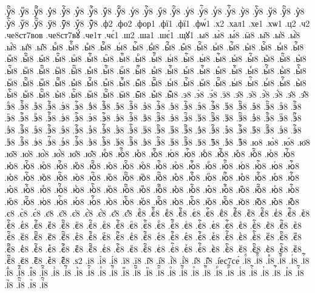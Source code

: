 {.уⷻ҇8
.уⷼ8
.уⷼ҇8
.уⷽ8
.уⷽ҇8
.уⷾ8
.уⷾ҇8
.уⷿ8
.уⷿ҇8
.уꙴ8
.уꙴ҇8
.уꙵ8
.уꙵ҇8
.уꙶ8
.уꙶ҇8
.уꙷ8
.уꙷ҇8
.уꙸ8
.уꙸ҇8
.уꙹ8
.уꙹ҇8
.уꙺ8
.уꙺ҇8
.уꙻ8
.уꙻ҇8
.у꙼8
.у꙼҇8
.у꙽8
.у꙽҇8
.ф2
.фо2
.фор1
.фї1
.фї1
.фѡ́1
.х2
.хал1
.хе1
.хѡ1
.ц2
.ч2
.че8ст7вов
.че8ст7вꙋ́
.че1т
.чє́1
.ш2
.ша1
.шє́1
.щꙋ1
.ы8
.ы̀8
.ы́8
.ӹ8
.ы̑8
.ы҆8
.ы҆̀8
.ы҆́8
.ы҆̈8
.ы҆̑8
.ыⷠ8
.ыⷠ҇8
.ыⷡ8
.ыⷡ҇8
.ыⷢ8
.ыⷢ҇8
.ыⷣ8
.ыⷣ҇8
.ыⷤ8
.ыⷤ҇8
.ыⷥ8
.ыⷥ҇8
.ыⷦ8
.ыⷦ҇8
.ыⷧ8
.ыⷧ҇8
.ыⷨ8
.ыⷨ҇8
.ыⷩ8
.ыⷩ҇8
.ыⷪ8
.ыⷪ҇8
.ыⷫ8
.ыⷫ҇8
.ыⷬ8
.ыⷬ҇8
.ыⷭ8
.ыⷭ҇8
.ыⷮ8
.ыⷮ҇8
.ыⷯ8
.ыⷯ҇8
.ыⷰ8
.ыⷰ҇8
.ыⷱ8
.ыⷱ҇8
.ыⷲ8
.ыⷲ҇8
.ыⷳ8
.ыⷳ҇8
.ыⷴ8
.ыⷴ҇8
.ыⷵ8
.ыⷵ҇8
.ыⷶ8
.ыⷶ҇8
.ыⷷ8
.ыⷷ҇8
.ыⷸ8
.ыⷸ҇8
.ыⷹ8
.ыⷹ҇8
.ыⷺ8
.ыⷺ҇8
.ыⷻ8
.ыⷻ҇8
.ыⷼ8
.ыⷼ҇8
.ыⷽ8
.ыⷽ҇8
.ыⷾ8
.ыⷾ҇8
.ыⷿ8
.ыⷿ҇8
.ыꙴ8
.ыꙴ҇8
.ыꙵ8
.ыꙵ҇8
.ыꙶ8
.ыꙶ҇8
.ыꙷ8
.ыꙷ҇8
.ыꙸ8
.ыꙸ҇8
.ыꙹ8
.ыꙹ҇8
.ыꙺ8
.ыꙺ҇8
.ыꙻ8
.ыꙻ҇8
.ы꙼8
.ы꙼҇8
.ы꙽8
.ы꙽҇8
.э8
.э̀8
.э́8
.ӭ8
.э̑8
.э҆8
.э҆̀8
.э҆́8
.э҆̈8
.э҆̑8
.эⷠ8
.эⷠ҇8
.эⷡ8
.эⷡ҇8
.эⷢ8
.эⷢ҇8
.эⷣ8
.эⷣ҇8
.эⷤ8
.эⷤ҇8
.эⷥ8
.эⷥ҇8
.эⷦ8
.эⷦ҇8
.эⷧ8
.эⷧ҇8
.эⷨ8
.эⷨ҇8
.эⷩ8
.эⷩ҇8
.эⷪ8
.эⷪ҇8
.эⷫ8
.эⷫ҇8
.эⷬ8
.эⷬ҇8
.эⷭ8
.эⷭ҇8
.эⷮ8
.эⷮ҇8
.эⷯ8
.эⷯ҇8
.эⷰ8
.эⷰ҇8
.эⷱ8
.эⷱ҇8
.эⷲ8
.эⷲ҇8
.эⷳ8
.эⷳ҇8
.эⷴ8
.эⷴ҇8
.эⷵ8
.эⷵ҇8
.эⷶ8
.эⷶ҇8
.эⷷ8
.эⷷ҇8
.эⷸ8
.эⷸ҇8
.эⷹ8
.эⷹ҇8
.эⷺ8
.эⷺ҇8
.эⷻ8
.эⷻ҇8
.эⷼ8
.эⷼ҇8
.эⷽ8
.эⷽ҇8
.эⷾ8
.эⷾ҇8
.эⷿ8
.эⷿ҇8
.эꙴ8
.эꙴ҇8
.эꙵ8
.эꙵ҇8
.эꙶ8
.эꙶ҇8
.эꙷ8
.эꙷ҇8
.эꙸ8
.эꙸ҇8
.эꙹ8
.эꙹ҇8
.эꙺ8
.эꙺ҇8
.эꙻ8
.эꙻ҇8
.э꙼8
.э꙼҇8
.э꙽8
.э꙽҇8
.ю8
.ю̀8
.ю́8
.ю̈8
.ю̑8
.ю҆8
.ю҆̀8
.ю҆́8
.ю҆̈8
.ю҆̑8
.юⷠ8
.юⷠ҇8
.юⷡ8
.юⷡ҇8
.юⷢ8
.юⷢ҇8
.юⷣ8
.юⷣ҇8
.юⷤ8
.юⷤ҇8
.юⷥ8
.юⷥ҇8
.юⷦ8
.юⷦ҇8
.юⷧ8
.юⷧ҇8
.юⷨ8
.юⷨ҇8
.юⷩ8
.юⷩ҇8
.юⷪ8
.юⷪ҇8
.юⷫ8
.юⷫ҇8
.юⷬ8
.юⷬ҇8
.юⷭ8
.юⷭ҇8
.юⷮ8
.юⷮ҇8
.юⷯ8
.юⷯ҇8
.юⷰ8
.юⷰ҇8
.юⷱ8
.юⷱ҇8
.юⷲ8
.юⷲ҇8
.юⷳ8
.юⷳ҇8
.юⷴ8
.юⷴ҇8
.юⷵ8
.юⷵ҇8
.юⷶ8
.юⷶ҇8
.юⷷ8
.юⷷ҇8
.юⷸ8
.юⷸ҇8
.юⷹ8
.юⷹ҇8
.юⷺ8
.юⷺ҇8
.юⷻ8
.юⷻ҇8
.юⷼ8
.юⷼ҇8
.юⷽ8
.юⷽ҇8
.юⷾ8
.юⷾ҇8
.юⷿ8
.юⷿ҇8
.юꙴ8
.юꙴ҇8
.юꙵ8
.юꙵ҇8
.юꙶ8
.юꙶ҇8
.юꙷ8
.юꙷ҇8
.юꙸ8
.юꙸ҇8
.юꙹ8
.юꙹ҇8
.юꙺ8
.юꙺ҇8
.юꙻ8
.юꙻ҇8
.ю꙼8
.ю꙼҇8
.ю꙽8
.ю꙽҇8
.є8
.є̀8
.є́8
.є̈8
.є̑8
.є҆8
.є҆̀8
.є҆́8
.є҆̈8
.є҆̑8
.єⷠ8
.єⷠ҇8
.єⷡ8
.єⷡ҇8
.єⷢ8
.єⷢ҇8
.єⷣ8
.єⷣ҇8
.єⷤ8
.єⷤ҇8
.єⷥ8
.єⷥ҇8
.єⷦ8
.єⷦ҇8
.єⷧ8
.єⷧ҇8
.єⷨ8
.єⷨ҇8
.єⷩ8
.єⷩ҇8
.єⷪ8
.єⷪ҇8
.єⷫ8
.єⷫ҇8
.єⷬ8
.єⷬ҇8
.єⷭ8
.єⷭ҇8
.єⷮ8
.єⷮ҇8
.єⷯ8
.єⷯ҇8
.єⷰ8
.єⷰ҇8
.єⷱ8
.єⷱ҇8
.єⷲ8
.єⷲ҇8
.єⷳ8
.єⷳ҇8
.єⷴ8
.єⷴ҇8
.єⷵ8
.єⷵ҇8
.єⷶ8
.єⷶ҇8
.єⷷ8
.єⷷ҇8
.єⷸ8
.єⷸ҇8
.єⷹ8
.єⷹ҇8
.єⷺ8
.єⷺ҇8
.єⷻ8
.єⷻ҇8
.єⷼ8
.єⷼ҇8
.єⷽ8
.єⷽ҇8
.єⷾ8
.єⷾ҇8
.єⷿ8
.єⷿ҇8
.єꙴ8
.єꙴ҇8
.єꙵ8
.єꙵ҇8
.єꙶ8
.єꙶ҇8
.єꙷ8
.єꙷ҇8
.єꙸ8
.єꙸ҇8
.єꙹ8
.єꙹ҇8
.єꙺ8
.єꙺ҇8
.єꙻ8
.єꙻ҇8
.є꙼8
.є꙼҇8
.є꙽8
.є꙽҇8
.ѕ2
.і8
.і̀8
.і́8
.ї8
.ї8
.і̑8
.і҆8
.і҆̀8
.і҆́8
.і҆̈8
.і҆̑8
.і҆ес7се́
.іⷠ8
.іⷠ҇8
.іⷡ8
.іⷡ҇8
.іⷢ8
.іⷢ҇8
.іⷣ8
.іⷣ҇8
.іⷤ8
.іⷤ҇8
.іⷥ8
.іⷥ҇8
.іⷦ8
.іⷦ҇8
.іⷧ8
.іⷧ҇8
.іⷨ8
.іⷨ҇8
.іⷩ8
.іⷩ҇8
.іⷪ8
.іⷪ҇8
.іⷫ8
.іⷫ҇8
.іⷬ8
.іⷬ҇8
.іⷭ8
.іⷭ҇8
.іⷮ8
.іⷮ҇8
.іⷯ8
.іⷯ҇8
.іⷰ8
.іⷰ҇8
.іⷱ8
.іⷱ҇8
}

